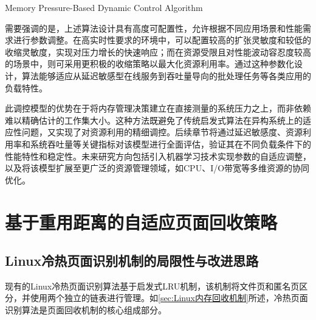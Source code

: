 \begin{algorithm}[htbp]
  \caption{Memory Pressure-Based Dynamic Control Algorithm}
  \label{alg:control}
\end{algorithm}


需要强调的是，上述算法设计具有高度可配置性，允许根据不同应用场景和性能需求进行参数调整。在高实时性要求的环境中，可以配置较高的扩张灵敏度和较低的收缩灵敏度，实现对压力增长的快速响应；而在资源受限且对性能波动容忍度较高的场景中，则可采用更积极的收缩策略以最大化资源利用率。通过这种参数化设计，算法能够适应从延迟敏感型在线服务到吞吐量导向的批处理任务等各类应用的负载特性。

此调控模型的优势在于将内存管理决策建立在直接测量的系统压力之上，而非依赖难以精确估计的工作集大小。这种方法既避免了传统启发式算法在异构系统上的适应性问题，又实现了对资源利用的精细调控。后续章节将通过延迟敏感度、资源利用率和系统吞吐量等关键指标对该模型进行全面评估，验证其在不同负载条件下的性能特性和稳定性。未来研究方向包括引入机器学习技术实现参数的自适应调整，以及将该模型扩展至更广泛的资源管理领域，如CPU、I/O带宽等多维资源的协同优化。

\section{基于重用距离的自适应页面回收策略}
\label{sec:基于重用距离的冷热页面优化}

\subsection{Linux冷热页面识别机制的局限性与改进思路}
现有的Linux冷热页面识别算法基于启发式LRU机制，该机制将文件页和匿名页区分，并使用两个独立的链表进行管理。如\ref{sec:Linux内存回收机制}所述，冷热页面识别算法是页面回收机制的核心组成部分。

